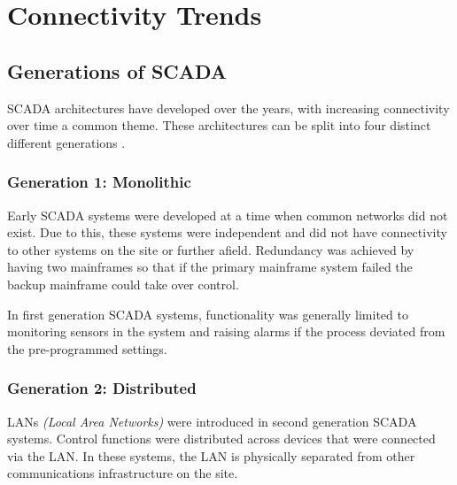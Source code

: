 \documentclass[12pt]{article}
\newcommand{\todo}[1]{\textcolor{red}{todo: #1}}
\newenvironment{todoenv}
  {\color{red}todo:}
  {\color{black}}
\begin{document}

\pagebreak
\section{Connectivity Trends}

\subsection{Generations of SCADA}
SCADA architectures have developed over the years, with increasing connectivity over time a common theme. These architectures can be split into four distinct different generations \citep{site:edgefxkits:scada:20141014}.
\subsubsection*{Generation 1: Monolithic}
Early SCADA systems were developed at a time when common networks did not exist. Due to this, these systems were independent and did not have connectivity to other systems on the site or further afield. Redundancy was achieved by having two mainframes so that if the primary mainframe system failed the backup mainframe could take over control.

In first generation SCADA systems, functionality was generally limited to monitoring sensors in the system and raising alarms if the process deviated from the pre-programmed settings.
\subsubsection*{Generation 2: Distributed}
LANs \textit{(Local Area Networks)} were introduced in second generation SCADA systems. Control functions were distributed across devices that were connected via the LAN. In these systems, the LAN is physically separated from other communications infrastructure on the site.
\end{document}
